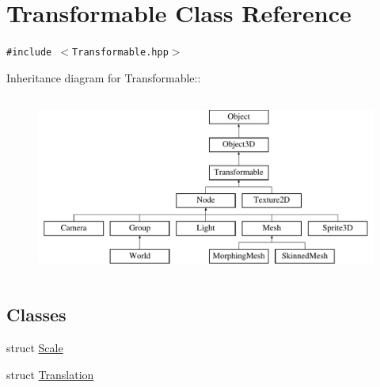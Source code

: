 \hypertarget{classm3g_1_1Transformable}{
\section{Transformable Class Reference}
\label{classm3g_1_1Transformable}
}
{\tt \#include $<$Transformable.hpp$>$}

Inheritance diagram for Transformable::\begin{figure}[H]
\begin{center}
\leavevmode
\includegraphics[height=6cm]{classm3g_1_1Transformable}
\end{center}
\end{figure}
\subsection*{Classes}
\begin{CompactItemize}
\item 
struct \hyperlink{structm3g_1_1Transformable_1_1Scale}{Scale}
\item 
struct \hyperlink{structm3g_1_1Transformable_1_1Translation}{Translation}
\end{CompactItemize}
